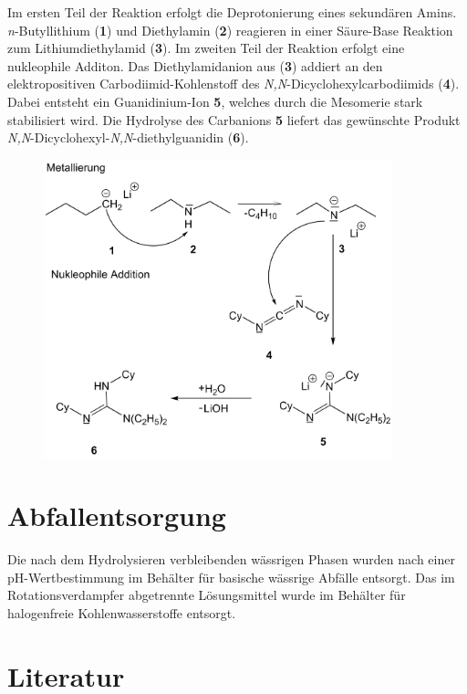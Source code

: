 \documentclass[12pt]{article}
\begin{document}
\begin{onehalfspace}
Im ersten Teil der Reaktion erfolgt die Deprotonierung eines sekundären Amins. 
 \textit{n}-Butyllithium (\textbf{1}) und Diethylamin (\textbf{2}) reagieren in einer
Säure-Base Reaktion zum Lithiumdiethylamid (\textbf{3}). Im zweiten Teil der Reaktion erfolgt eine nukleophile Additon.
Das Diethylamidanion aus (\textbf{3}) addiert an den elektropositiven Carbodiimid-Kohlenstoff des \textit{N,N}-Dicyclohexylcarbodiimids (\textbf{4}). Dabei entsteht ein Guanidinium-Ion \textbf{5}, welches durch die Mesomerie stark stabilisiert wird. Die Hydrolyse des Carbanions \textbf{5} liefert das gewünschte Produkt \textit{N\textquotesingle,N\textquotesingle\textquotesingle}-Dicyclohexyl-\textit{N,N}-diethylguanidin (\textbf{6}).
\begin{figure}[!htbp]
\centering
\includegraphics[width=0.9\textwidth]{mechan.png}
\end{figure}

\section{Abfallentsorgung}
Die nach dem Hydrolysieren verbleibenden wässrigen Phasen wurden
nach einer pH-Wertbestimmung im Behälter für basische wässrige Abfälle entsorgt.
Das im Rotationsverdampfer abgetrennte Lösungsmittel wurde im Behälter für halogenfreie Kohlenwasserstoffe entsorgt.
\section{Literatur}


\end{onehalfspace}
\end{document}
